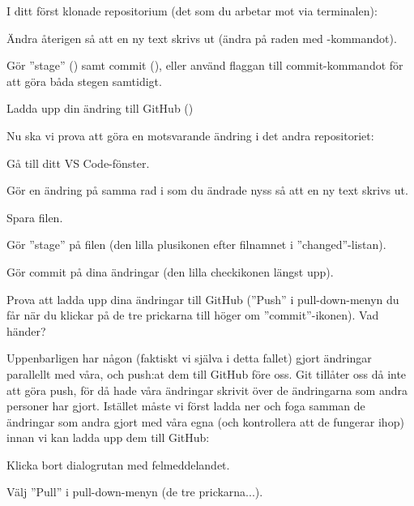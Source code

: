 \begin{Datorarbete}

	\code{[\ref{git-conflict-1}]} I ditt först klonade repositorium (det som du arbetar mot via terminalen):
	\begin{Deluppgifter}
		\item Ändra återigen  så att en ny text skrivs ut (ändra på raden med -kommandot).
		\item Gör ''stage'' () samt commit (), eller använd flaggan  till commit-kommandot för att göra båda stegen samtidigt.
		\item Ladda upp din ändring till GitHub ()
	\end{Deluppgifter}

	Nu ska vi prova att göra en motsvarande ändring i det andra repositoriet:
	\begin{Deluppgifter}
		\item Gå till ditt VS Code-fönster.
		\item Gör en ändring på samma rad i  som du ändrade nyss så att en ny text skrivs ut.
		\item Spara filen.
		\item Gör ''stage'' på filen (den lilla plusikonen efter filnamnet i ''changed''-listan).
		\item Gör commit på dina ändringar (den lilla checkikonen längst upp).
		\item Prova att ladda upp dina ändringar till GitHub (''Push'' i pull-down-menyn du får när du klickar på de tre prickarna till höger om ''commit''-ikonen). Vad händer?
	\end{Deluppgifter}

	Uppenbarligen har någon (faktiskt vi själva i detta fallet) gjort ändringar parallellt med våra, och push:at dem till GitHub före oss. Git tillåter oss då inte att göra push, för då hade våra ändringar skrivit över de ändringarna som andra personer har gjort.	Istället måste vi först ladda ner och foga samman de ändringar som andra gjort med våra egna (och kontrollera att de fungerar ihop) innan vi kan ladda upp dem till GitHub:

	\begin{Deluppgifter}
		\item Klicka bort dialogrutan med felmeddelandet.
		\item Välj ''Pull'' i pull-down-menyn (de tre prickarna...).
	\end{Deluppgifter}


\end{Datorarbete}
